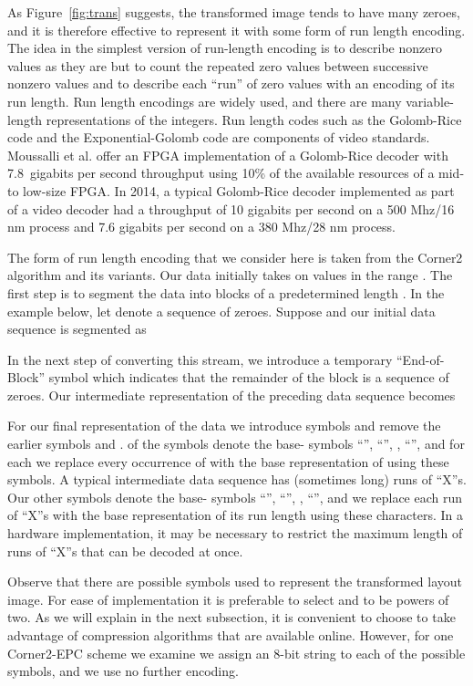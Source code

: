 \documentclass{article}
\begin{document}
As Figure~\ref{fig:trans} suggests, the transformed image tends to have many
zeroes, and it is therefore effective to represent it with some form of 
run length encoding.  The idea in the simplest version of run-length
encoding is to describe nonzero values as they are but to count the repeated
zero values between successive nonzero values and to describe each ``run''
of zero values with an encoding of its run length.  Run length encodings
are widely used, and there are many variable-length representations
of the integers. 
Run length codes such as the Golomb-Rice code and the
Exponential-Golomb code are components of video standards.
Moussalli et al. offer an FPGA implementation of a Golomb-Rice decoder
with 7.8~gigabits per second throughput using 10\% of the available resources
of a mid- to low-size FPGA.
In 2014, a typical Golomb-Rice decoder implemented as part of a video decoder
had a throughput of 10 gigabits per second on a 500 Mhz/16 nm process and
7.6 gigabits per second on a 380 Mhz/28 nm process.

The form of run length encoding that we consider here is taken from the
Corner2 algorithm and its variants.  Our data initially takes on values in
the range .  The first step is to
segment the data into blocks of a predetermined length .
In the example below, let  denote a sequence of  zeroes.
Suppose  and our initial data sequence is segmented as

In the next step of converting this stream, we introduce a temporary 
``End-of-Block''
symbol  which indicates that the remainder of the block is a sequence of
zeroes.  Our intermediate representation of the preceding data sequence
becomes

For our final representation of the data we introduce  symbols
and remove the earlier symbols  and .   of the symbols denote
the base- symbols ``'', ``'',  , ``'',
and for each  we replace every occurrence of  with the
base  representation of  using these  symbols.
A typical intermediate data sequence has (sometimes long) runs of ``X''s.
Our other  symbols denote
the base- symbols ``'', ``'',  , ``'',
and we replace each run of ``X''s with the base  representation of its
run length using these  characters.  In a hardware implementation, it may
be necessary to restrict the maximum length of runs of ``X''s that can be
decoded at once.

Observe that there are  possible symbols used to represent the
transformed layout image.  For ease of implementation it is preferable to
select  and  to be powers of two. As we will explain in the next 
subsection, it is
convenient to choose  to take advantage of compression
algorithms that are available online.  However, for one 
Corner2-EPC scheme we examine we assign an 8-bit string to each of the
 possible symbols, and we use no further encoding.
\end{document}
